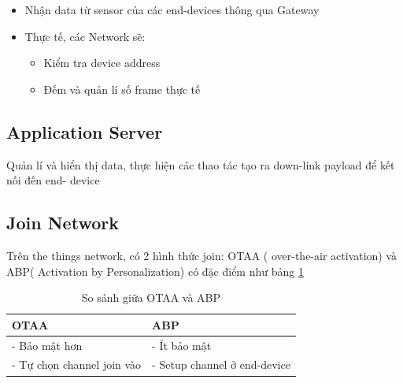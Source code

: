 \begin{itemize}
    \item Nhận data từ sensor của các end-devices thông qua Gateway
    \item Thực tế, các Network sẽ:
    \begin{itemize}
        \item Kiểm tra device address
        \item Đếm và quản lí số frame thực tế
    \end{itemize}
\end{itemize}

\subsection{Application Server}
Quản lí và hiển thị data, thực hiện các thao tác tạo ra down-link payload để kết nối đến end- device

\subsection{Join Network}
Trên the things network, có 2 hình thức join: OTAA ( over-the-air activation) và ABP( Activation by Personalization) có đặc điểm như bảng \ref{tab.network.otaa}

\begin{table}[H]
    \centering
    \caption{So sánh giữa OTAA và ABP} 
    \label{tab.network.otaa}
    \begin{tabular}{| m{6cm} | m{6cm} |}
        \hline
        OTAA & ABP \\

        \hline
        -	Bảo mật hơn & - Ít bảo mật \\
        -	Tự chọn channel join vào & - Setup channel ở end-device \\
        
        \hline
    \end{tabular}
\end{table}

